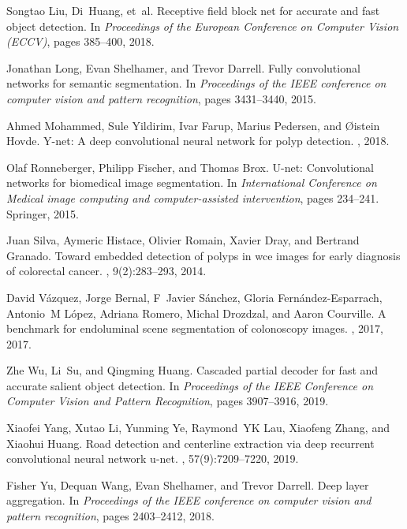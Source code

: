 \documentclass{article}
\begin{document}
\begin{thebibliography}{10}
Songtao Liu, Di~Huang, et~al.
\newblock Receptive field block net for accurate and fast object detection.
\newblock In {\em Proceedings of the European Conference on Computer Vision
  (ECCV)}, pages 385--400, 2018.

Jonathan Long, Evan Shelhamer, and Trevor Darrell.
\newblock Fully convolutional networks for semantic segmentation.
\newblock In {\em Proceedings of the IEEE conference on computer vision and
  pattern recognition}, pages 3431--3440, 2015.

Ahmed Mohammed, Sule Yildirim, Ivar Farup, Marius Pedersen, and {\O}istein
  Hovde.
\newblock Y-net: A deep convolutional neural network for polyp detection.
, 2018.

Olaf Ronneberger, Philipp Fischer, and Thomas Brox.
\newblock U-net: Convolutional networks for biomedical image segmentation.
\newblock In {\em International Conference on Medical image computing and
  computer-assisted intervention}, pages 234--241. Springer, 2015.

Juan Silva, Aymeric Histace, Olivier Romain, Xavier Dray, and Bertrand Granado.
\newblock Toward embedded detection of polyps in wce images for early diagnosis
  of colorectal cancer.
, 9(2):283--293, 2014.

David V{\'a}zquez, Jorge Bernal, F~Javier S{\'a}nchez, Gloria
  Fern{\'a}ndez-Esparrach, Antonio~M L{\'o}pez, Adriana Romero, Michal
  Drozdzal, and Aaron Courville.
\newblock A benchmark for endoluminal scene segmentation of colonoscopy images.
, 2017, 2017.

Zhe Wu, Li~Su, and Qingming Huang.
\newblock Cascaded partial decoder for fast and accurate salient object
  detection.
\newblock In {\em Proceedings of the IEEE Conference on Computer Vision and
  Pattern Recognition}, pages 3907--3916, 2019.

Xiaofei Yang, Xutao Li, Yunming Ye, Raymond~YK Lau, Xiaofeng Zhang, and Xiaohui
  Huang.
\newblock Road detection and centerline extraction via deep recurrent
  convolutional neural network u-net.
,
  57(9):7209--7220, 2019.

Fisher Yu, Dequan Wang, Evan Shelhamer, and Trevor Darrell.
\newblock Deep layer aggregation.
\newblock In {\em Proceedings of the IEEE conference on computer vision and
  pattern recognition}, pages 2403--2412, 2018.


\end{thebibliography}
\end{document}
